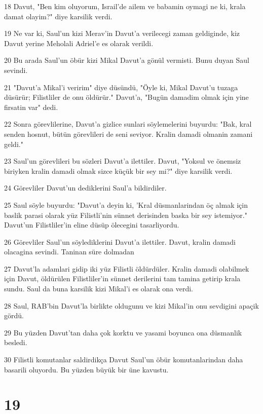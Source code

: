 \par 18 Davut, "Ben kim oluyorum, Israil'de ailem ve babamin oymagi ne ki, krala damat olayim?" diye karsilik verdi.
\par 19 Ne var ki, Saul'un kizi Merav'in Davut'a verilecegi zaman geldiginde, kiz Davut yerine Meholali Adriel'e es olarak verildi.
\par 20 Bu arada Saul'un öbür kizi Mikal Davut'a gönül vermisti. Bunu duyan Saul sevindi.
\par 21 "Davut'a Mikal'i veririm" diye düsündü, "Öyle ki, Mikal Davut'u tuzaga düsürür; Filistliler de onu öldürür." Davut'a, "Bugün damadim olmak için yine firsatin var" dedi.
\par 22 Sonra görevlilerine, Davut'a gizlice sunlari söylemelerini buyurdu: "Bak, kral senden hosnut, bütün görevlileri de seni seviyor. Kralin damadi olmanin zamani geldi."
\par 23 Saul'un görevlileri bu sözleri Davut'a ilettiler. Davut, "Yoksul ve önemsiz biriyken kralin damadi olmak sizce küçük bir sey mi?" diye karsilik verdi.
\par 24 Görevliler Davut'un dediklerini Saul'a bildirdiler.
\par 25 Saul söyle buyurdu: "Davut'a deyin ki, 'Kral düsmanlarindan öç almak için baslik parasi olarak yüz Filistli'nin sünnet derisinden baska bir sey istemiyor." Davut'un Filistliler'in eline düsüp ölecegini tasarliyordu.
\par 26 Görevliler Saul'un söylediklerini Davut'a ilettiler. Davut, kralin damadi olacagina sevindi. Taninan süre dolmadan
\par 27 Davut'la adamlari gidip iki yüz Filistli öldürdüler. Kralin damadi olabilmek için Davut, öldürülen Filistliler'in sünnet derilerini tam tamina getirip krala sundu. Saul da buna karsilik kizi Mikal'i es olarak ona verdi.
\par 28 Saul, RAB'bin Davut'la birlikte oldugunu ve kizi Mikal'in onu sevdigini apaçik gördü.
\par 29 Bu yüzden Davut'tan daha çok korktu ve yasami boyunca ona düsmanlik besledi.
\par 30 Filistli komutanlar saldirdikça Davut Saul'un öbür komutanlarindan daha basarili oluyordu. Bu yüzden büyük bir üne kavustu.

\chapter{19}

